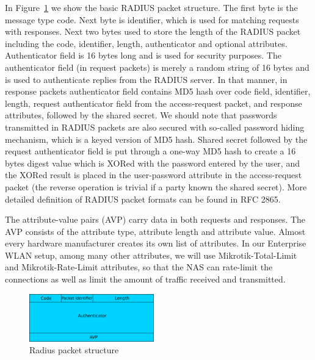 In Figure~\ref{fig:radius_packet} we show the basic RADIUS packet structure. The first byte is the message type 
code. Next byte is identifier, which is used for matching requests with responses. Next two 
bytes used to store the length of the RADIUS packet including the code, identifier, length, 
authenticator and optional attributes. Authenticator field is 16 bytes 
long and is used for security purposes. The authenticator field (in request packets) is merely a random 
string of 16 bytes and is used to authenticate replies from the RADIUS server. In that manner, in 
response packets authenticator field contains MD5 hash over code field, identifier, length, 
request authenticator field from the access-request packet, and response attributes, 
followed by the shared secret. We should note that passwords transmitted in RADIUS packets
are also secured with so-called password hiding mechanism, which is a keyed version of MD5 hash.
Shared secret followed by the request authenticator field is put through a one-way
MD5 hash to create a 16 bytes digest value which is XORed with the password entered 
by the user, and the XORed result is placed in the user-password attribute in the 
access-request packet (the reverse operation is trivial if a party known the shared secret). 
More detailed definition of RADIUS packet formats can be found in RFC 2865.


The attribute-value pairs (AVP) carry data in both requests and responses. The AVP consists of the 
attribute type, attribute length and attribute value. Almost every hardware manufacturer creates 
its own list of attributes. In our Enterprise WLAN setup, among many other attributes, we will use Mikrotik-Total-Limit and Mikrotik-Rate-Limit attributes, so that the NAS can rate-limit the 
connections as well as limit the amount of traffic received and transmitted.

\begin{figure}[!h]
	\includegraphics[width=0.48\textwidth]{graphics/radius_packet.png}
	\caption{Radius packet structure}
	\label{fig:radius_packet}
\end{figure}


